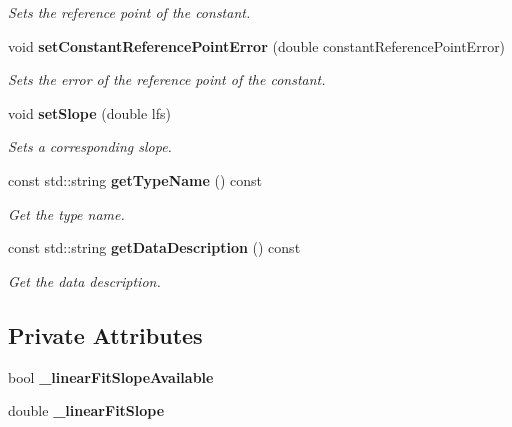 \begin{DoxyCompactItemize}
\begin{DoxyCompactList}\small\item\em Sets the reference point of the constant. \item\end{DoxyCompactList}\item 
void {\bf setConstantReferencePointError} (double constantReferencePointError)\label{classCALICE_1_1LinearFitConstant_a7ed2758698bd0da83348812817c4395a}

\begin{DoxyCompactList}\small\item\em Sets the error of the reference point of the constant. \item\end{DoxyCompactList}\item 
void {\bf setSlope} (double lfs)
\begin{DoxyCompactList}\small\item\em Sets a corresponding slope. \item\end{DoxyCompactList}\item 
const std::string {\bf getTypeName} () const 
\begin{DoxyCompactList}\small\item\em Get the type name. \item\end{DoxyCompactList}\item 
const std::string {\bf getDataDescription} () const 
\begin{DoxyCompactList}\small\item\em Get the data description. \item\end{DoxyCompactList}\end{DoxyCompactItemize}
\subsection*{Private Attributes}
\begin{DoxyCompactItemize}
\item 
bool {\bfseries \_\-linearFitSlopeAvailable}\label{classCALICE_1_1LinearFitConstant_a9e340a4dfbc49f5664a348ea97bf7c5a}

\item 
double {\bfseries \_\-linearFitSlope}\label{classCALICE_1_1LinearFitConstant_aa335a19743f509655fe5bf8a00563a82}

\end{DoxyCompactItemize}



